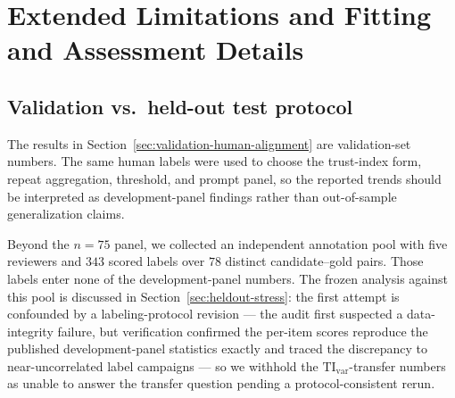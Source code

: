 \documentclass{article}
\begin{document}




\appendix

\section{Extended Limitations and Fitting and Assessment Details}\label{app:limitations-extended}

\subsection{Validation vs.\ held-out test protocol}
The results in Section~\ref{sec:validation-human-alignment} are validation-set numbers. The same human labels were used to choose the trust-index form, repeat aggregation, threshold, and prompt panel, so the reported trends should be interpreted as development-panel findings rather than out-of-sample generalization claims.

Beyond the \(n=75\) panel, we collected an independent annotation pool with five reviewers and \(343\) scored labels over \(78\) distinct candidate--gold pairs. Those labels enter none of the development-panel numbers. The frozen analysis against this pool is discussed in Section~\ref{sec:heldout-stress}: the first attempt is confounded by a labeling-protocol revision --- the audit first suspected a data-integrity failure, but verification confirmed the per-item scores reproduce the published development-panel statistics exactly and traced the discrepancy to near-uncorrelated label campaigns --- so we withhold the \(\mathrm{TI}_{\mathrm{var}}\)-transfer numbers as unable to answer the transfer question pending a protocol-consistent rerun.
\end{document}
